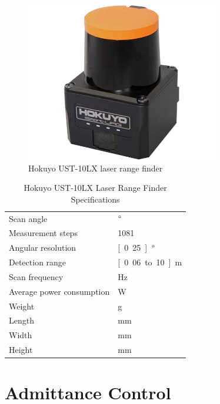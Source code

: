 \begin{figure}[h]
   \centering
   \includegraphics[width=0.75\textwidth]{images/hokuyo.jpg}
   \caption{Hokuyo UST-10LX laser range finder}
   \label{pics:hokuyo}
\end{figure}

\begin{table}[h]
\begin{center}
 \caption{Hokuyo UST-10LX Laser Range Finder Specifications}\vspace{1ex}
 \label{tab:hokuyo}
 \begin{tabular}{ll}
 \hline
 Scan angle & \unit[250]{$\degree$} \\
 Measurement steps & 1081 \\
 Angular resolution & \unit[0.25]{$\degree$} \\
 Detection range & \unit[0.06 to 10]{m} \\
 Scan frequency & \unit[40]{Hz} \\
 Average power consumption & \unit[3]{W} \\
 Weight & \unit[130]{g} \\
 Length & \unit[50]{mm} \\
 Width & \unit[50]{mm} \\
 Height &  \unit[70]{mm} \\
 \hline
 \end{tabular}
\end{center}
\end{table}

\chapter{Admittance Control}
	\label{sec:adm_ctrl}
	
